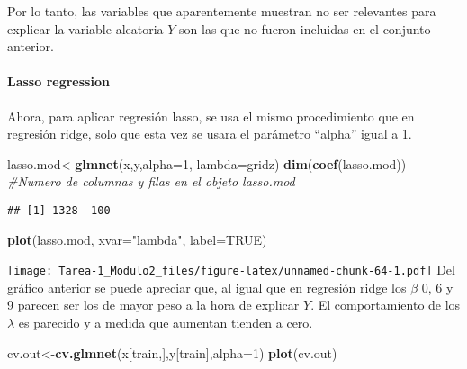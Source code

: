 \documentclass[
]{article}
\newenvironment{Shaded}{\begin{snugshade}}{\end{snugshade}}
\newcommand{\CommentTok}[1]{\textcolor[rgb]{0.56,0.35,0.01}{\textit{#1}}}
\newcommand{\DataTypeTok}[1]{\textcolor[rgb]{0.13,0.29,0.53}{#1}}
\newcommand{\DecValTok}[1]{\textcolor[rgb]{0.00,0.00,0.81}{#1}}
\newcommand{\KeywordTok}[1]{\textcolor[rgb]{0.13,0.29,0.53}{\textbf{#1}}}
\newcommand{\NormalTok}[1]{#1}
\newcommand{\OtherTok}[1]{\textcolor[rgb]{0.56,0.35,0.01}{#1}}
\newcommand{\StringTok}[1]{\textcolor[rgb]{0.31,0.60,0.02}{#1}}
\begin{document}
Por lo tanto, las variables que aparentemente muestran no ser relevantes
para explicar la variable aleatoria \(Y\) son las que no fueron
incluidas en el conjunto anterior.

\hypertarget{lasso-regression}{%
\paragraph{Lasso regression}\label{lasso-regression}}

Ahora, para aplicar regresión lasso, se usa el mismo procedimiento que
en regresión ridge, solo que esta vez se usara el parámetro ``alpha''
igual a 1.

\begin{Shaded}
\begin{Highlighting}[]
\NormalTok{lasso.mod<-}\KeywordTok{glmnet}\NormalTok{(x,y,}\DataTypeTok{alpha=}\DecValTok{1}\NormalTok{, }\DataTypeTok{lambda=}\NormalTok{gridz)}
\KeywordTok{dim}\NormalTok{(}\KeywordTok{coef}\NormalTok{(lasso.mod)) }\CommentTok{#Numero de columnas y filas en el objeto lasso.mod}
\end{Highlighting}
\end{Shaded}

\begin{verbatim}
## [1] 1328  100
\end{verbatim}

\begin{Shaded}
\begin{Highlighting}[]
\KeywordTok{plot}\NormalTok{(lasso.mod, }\DataTypeTok{xvar=}\StringTok{"lambda"}\NormalTok{, }\DataTypeTok{label=}\OtherTok{TRUE}\NormalTok{)}
\end{Highlighting}
\end{Shaded}

\texttt{[image: Tarea-1\_Modulo2\_files/figure-latex/unnamed-chunk-64-1.pdf]}
Del gráfico anterior se puede apreciar que, al igual que en regresión
ridge los \(\beta\) 0, 6 y 9 parecen ser los de mayor peso a la hora de
explicar \(Y\). El comportamiento de los \(\lambda\) es parecido y a
medida que aumentan tienden a cero.

\begin{Shaded}
\begin{Highlighting}[]
\NormalTok{cv.out<-}\KeywordTok{cv.glmnet}\NormalTok{(x[train,],y[train],}\DataTypeTok{alpha=}\DecValTok{1}\NormalTok{)}
\KeywordTok{plot}\NormalTok{(cv.out)}
\end{Highlighting}
\end{Shaded}
\end{document}
